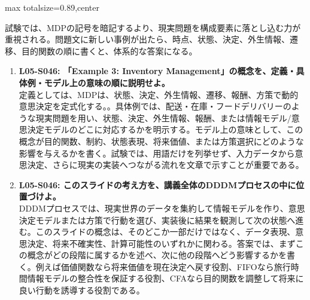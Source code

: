 \begin{minipage}[t]{0.58\textwidth}
\begin{adjustbox}{max totalsize={\textwidth}{0.89\textheight},center}
\begin{minipage}{\textwidth}
試験では、MDPの記号を暗記するより、現実問題を構成要素に落とし込む力が重視される。問題文に新しい事例が出たら、時点、状態、決定、外生情報、遷移、目的関数の順に書くと、体系的な答案になる。\par{}\begin{enumerate}\item \textbf{L05-S046: 「Example 3: Inventory Management」の概念を、定義・具体例・モデル上の意味の順に説明せよ。}\\定義としては、MDPは、状態、決定、外生情報、遷移、報酬、方策で動的意思決定を定式化する。。具体例では、配送・在庫・フードデリバリーのような現実問題を用い、状態、決定、外生情報、報酬、または情報モデル/意思決定モデルのどこに対応するかを明示する。モデル上の意味として、この概念が目的関数、制約、状態表現、将来価値、または方策選択にどのような影響を与えるかを書く。試験では、用語だけを列挙せず、入力データから意思決定、さらに現実の実装へつながる流れを文章で示すことが重要である。\item \textbf{L05-S046: このスライドの考え方を、講義全体のDDDMプロセスの中に位置づけよ。}\\DDDMプロセスでは、現実世界のデータを集約して情報モデルを作り、意思決定モデルまたは方策で行動を選び、実装後に結果を観測して次の状態へ進む。このスライドの概念は、そのどこか一部だけではなく、データ表現、意思決定、将来不確実性、計算可能性のいずれかに関わる。答案では、まずこの概念がどの段階に属するかを述べ、次に他の段階へどう影響するかを書く。例えば価値関数なら将来価値を現在決定へ戻す役割、FIFOなら旅行時間情報モデルの整合性を保証する役割、CFAなら目的関数を調整して将来に良い行動を誘導する役割である。\end{enumerate}
\end{minipage}
\end{adjustbox}
\end{minipage}


